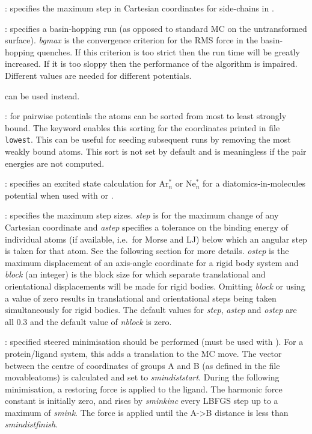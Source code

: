 : specifies the maximum step in Cartesian coordinates for side-chains
in {\/}.

: specifies a basin-hopping run (as opposed to standard MC
on the untransformed surface). {\it bgmax\/} is the convergence criterion
for the RMS force in the basin-hopping
quenches. If this criterion is too strict then the run time will be greatly increased.
If it is too sloppy then the performance of the algorithm is impaired. Different values
are needed for different potentials.{ can be used instead.

: for pairwise potentials the atoms can be sorted from most to least
strongly bound. The {} keyword enables this sorting for the coordinates printed
in file {\tt lowest}. This can be useful for seeding subsequent runs by removing the
most weakly bound atoms. This sort is not set by default and is meaningless if the
pair energies are not computed.

: specifies an excited state calculation for Ar$^*_n$ or Ne$^*_n$ for
a diatomics-in-molecules potential when used with {\/} or {\/}.

: specifies the maximum step sizes. {\it step\/} is
for the maximum change of any Cartesian coordinate and {\it astep\/} specifies a tolerance
on the binding energy of individual atoms (if available, i.e.~for Morse and LJ) below
which an angular step is taken for that atom. See the following section for more details.
{\it ostep\/} is the maximum displacement of an axis-angle coordinate for a rigid body system
and {\it block\/} (an integer) is the block size for which separate translational and orientational
displacements will be made for rigid bodies. Omitting {\it block\/} or using a value of zero results in
translational and orientational steps being taken simultaneously
for rigid bodies. The default values for {\it step\/},
{\it astep\/} and {\it ostep\/} are all 0.3 and the default value of {\it nblock\/} is zero.

: specified steered 
minimisation should be performed (must be used with {}). For a protein/ligand system, this adds a translation
to the MC move. The vector between the centre of coordinates of groups A and B (as defined in the file movableatoms)
is calculated and set to {\it smindiststart}. During the following minimisation, a restoring force is applied to 
the ligand. The harmonic force constant is initially zero, and rises by {\it sminkinc} every LBFGS step up to a
maximum of {\it smink}. The force is applied until the A->B distance is less than {\it smindistfinish}.  

}
